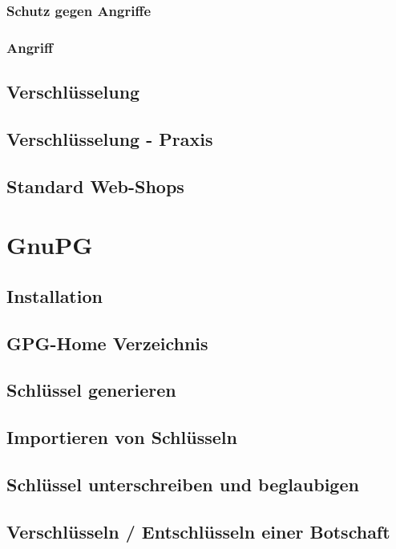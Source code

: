 \subsubsection*{Schutz gegen Angriffe}
\subsubsection*{Angriff}

\subsection{Verschlüsselung}

\subsection{Verschlüsselung - Praxis}

\subsection{Standard Web-Shops}

\section{GnuPG}

\subsection{Installation}

\subsection{GPG-Home Verzeichnis}

\subsection{Schlüssel generieren}

\subsection{Importieren von Schlüsseln}

\subsection{Schlüssel unterschreiben und beglaubigen}

\subsection{Verschlüsseln / Entschlüsseln einer Botschaft}

